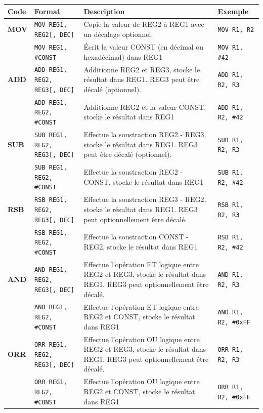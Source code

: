 \documentclass{tufte-handout}
\begin{document}
\begin{table}
\begin{tabular}{l|l|p{7.5cm}l}
Code & Format & Description & Exemple \\ \hline
\textbf{MOV} & \texttt{MOV REG1, REG2[, DEC]} 	& Copie la valeur de REG2 à REG1 avec un décalage optionnel. & \texttt{MOV R1, R2} \\
 			 & \texttt{MOV REG1, \#CONST} 			& Écrit la valeur CONST (en décimal ou hexadécimal) dans REG1 & \texttt{MOV R1, \#42} \\
\hline
\textbf{ADD} & \texttt{ADD REG1, REG2, REG3[, DEC]} 	& Additionne REG2 et REG3, stocke le résultat dans REG1. REG3 peut être décalé (optionnel). & \texttt{ADD R1, R2, R3} \\
 			 & \texttt{ADD REG1, REG2, \#CONST} 			& Additionne REG2 et la valeur CONST, stocke le résultat dans REG1 & \texttt{ADD R1, R2, \#42} \\
\hline
\textbf{SUB} & \texttt{SUB REG1, REG2, REG3[, DEC]} 	& Effectue la soustraction REG2 - REG3, stocke le résultat dans REG1. REG3 peut être décalé (optionnel). & \texttt{SUB R1, R2, R3} \\
 			 & \texttt{SUB REG1, REG2, \#CONST} 			& Effectue la soustraction REG2 - CONST, stocke le résultat dans REG1 & \texttt{SUB R1, R2, \#42} \\
\hline
\textbf{RSB} & \texttt{RSB REG1, REG2, REG3[, DEC]} 	& Effectue la soustraction REG3 - REG2, stocke le résultat dans REG1. REG3 peut optionnellement être décalé. & \texttt{RSB R1, R2, R3} \\
 			 & \texttt{RSB REG1, REG2, \#CONST} 			& Effectue la soustraction CONST - REG2, stocke le résultat dans REG1 & \texttt{RSB R1, R2, \#42} \\
\hline
\textbf{AND} & \texttt{AND REG1, REG2, REG3[, DEC]} 	& Effectue l'opération ET logique entre REG2 et REG3, stocke le résultat dans REG1. REG3 peut optionnellement être décalé. & \texttt{AND R1, R2, R3} \\
 			 & \texttt{AND REG1, REG2, \#CONST} 			& Effectue l'opération ET logique entre REG2 et CONST, stocke le résultat dans REG1 & \texttt{AND R1, R2, \#0xFF} \\
\hline
\textbf{ORR} & \texttt{ORR REG1, REG2, REG3[, DEC]} 	& Effectue l'opération OU logique entre REG2 et REG3, stocke le résultat dans REG1. REG3 peut optionnellement être décalé. & \texttt{ORR R1, R2, R3} \\
 			 & \texttt{ORR REG1, REG2, \#CONST} 			& Effectue l'opération OU logique entre REG2 et CONST, stocke le résultat dans REG1 & \texttt{ORR R1, R2, \#0xFF} \\

\end{tabular}
\end{table}
\end{document}
